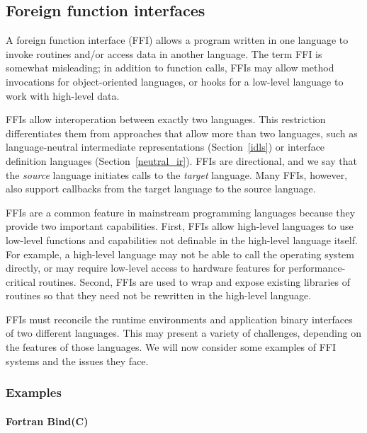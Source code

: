 
\subsection{Foreign function interfaces}
\label{sec:ffi}

A foreign function interface (FFI) allows a program written in one
language to invoke routines and/or access data in another
language. The term FFI is somewhat misleading; in addition to
function calls, FFIs may allow method invocations for
object-oriented languages, or hooks for a low-level language to
work with high-level data.

FFIs allow interoperation between exactly two languages. This
restriction differentiates them from approaches that allow more
than two languages, such as language-neutral intermediate
representations (Section~\ref{idls}) or interface definition
languages (Section~\ref{neutral_ir}). FFIs are directional, and we
say that the \emph{source} language initiates calls to the
\emph{target} language. Many FFIs, however, also support callbacks
from the target language to the source language.

FFIs are a common feature in mainstream programming languages
because they provide two important capabilities. First, FFIs allow
high-level languages to use low-level functions and capabilities
not definable in the high-level language itself. For example, a
high-level language may not be able to call the operating system
directly, or may require low-level access to hardware features for
performance-critical routines. Second, FFIs are used to wrap and
expose existing libraries of routines so that they need not be
rewritten in the high-level language.

FFIs must reconcile the runtime environments and application binary interfaces of two different languages. This may present a variety of challenges, depending on the features of those languages. We will now consider some examples of FFI systems and the issues they face.


\subsubsection{Examples}

\paragraph{Fortran Bind(C)}

